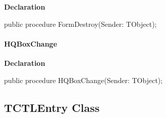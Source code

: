 \documentclass{report}
\newif\ifpdf
\begin{document}
\label{swcatalog.TSCForm-FormDestroy}
\begin{list}{}{
\setlength{\itemindent}{0cm}
\setlength{\listparindent}{0cm}
\setlength{\leftmargin}{\evensidemargin}
\addtolength{\leftmargin}{\tmplength}
\settowidth{\labelsep}{X}
\addtolength{\leftmargin}{\labelsep}
\setlength{\labelwidth}{\tmplength}
}
\item[\textbf{Declaration}\hfill]
\ifpdf
\begin{flushleft}
\fi
\begin{ttfamily}
public procedure FormDestroy(Sender: TObject);\end{ttfamily}

\ifpdf
\end{flushleft}
\fi

\end{list}
\paragraph*{HQBoxChange}\hspace*{\fill}

\label{swcatalog.TSCForm-HQBoxChange}
\begin{list}{}{
\setlength{\itemindent}{0cm}
\setlength{\listparindent}{0cm}
\setlength{\leftmargin}{\evensidemargin}
\addtolength{\leftmargin}{\tmplength}
\settowidth{\labelsep}{X}
\addtolength{\leftmargin}{\labelsep}
\setlength{\labelwidth}{\tmplength}
}
\item[\textbf{Declaration}\hfill]
\ifpdf
\begin{flushleft}
\fi
\begin{ttfamily}
public procedure HQBoxChange(Sender: TObject);\end{ttfamily}

\ifpdf
\end{flushleft}
\fi

\end{list}
\ifpdf
\subsection*{\large{\textbf{TCTLEntry Class}}\normalsize\hspace{1ex}\hrulefill}
\else
\subsection*{TCTLEntry Class}
\fi
\label{swcatalog.TCTLEntry}
\end{document}

